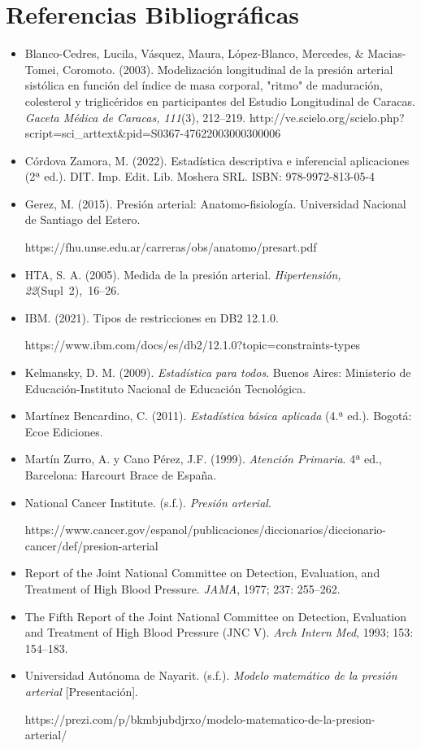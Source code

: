 \documentclass[a4paper,10pt]{article}
\begin{document}
\vspace{2em}

\section*{Referencias Bibliográficas}

\begin{small}
\begin{itemize}
    \item Blanco-Cedres, Lucila, Vásquez, Maura, López-Blanco, Mercedes, \& Macias-Tomei, Coromoto. (2003). Modelización longitudinal de la presión arterial sistólica en función del índice de masa corporal, "ritmo" de maduración, colesterol y triglicéridos en participantes del Estudio Longitudinal de Caracas. \textit{Gaceta Médica de Caracas, 111}(3), 212–219. http://ve.scielo.org/scielo.php?script=sci\_arttext\&pid=S0367-47622003000300006
    \item Córdova Zamora, M. (2022). Estadística descriptiva e inferencial aplicaciones (2ª ed.). DIT. Imp. Edit. Lib. Moshera SRL. ISBN: 978-9972-813-05-4
    \item Gerez, M. (2015). Presión arterial: Anatomo-fisiología. Universidad Nacional de Santiago del Estero. 
    
    https://fhu.unse.edu.ar/carreras/obs/anatomo/presart.pdf
    \item HTA, S. A. (2005). Medida de la presión arterial. \textit{Hipertensión, 22}(Supl 2), 16–26.
    \item IBM. (2021). Tipos de restricciones en DB2 12.1.0. 
    
    https://www.ibm.com/docs/es/db2/12.1.0?topic=constraints-types
    \item Kelmansky, D. M. (2009). \textit{Estadística para todos}. Buenos Aires: Ministerio de Educación-Instituto Nacional de Educación Tecnológica.
    \item Martínez Bencardino, C. (2011). \textit{Estadística básica aplicada} (4.ª ed.). Bogotá: Ecoe Ediciones.
    \item Martín Zurro, A. y Cano Pérez, J.F. (1999). \textit{Atención Primaria}. 4ª ed., Barcelona: Harcourt Brace de España.
    \item National Cancer Institute. (s.f.). \textit{Presión arterial}. 
    
    https://www.cancer.gov/espanol/publicaciones/diccionarios/diccionario-cancer/def/presion-arterial
    \item Report of the Joint National Committee on Detection, Evaluation, and Treatment of High Blood Pressure. \textit{JAMA}, 1977; 237: 255–262.
    \item The Fifth Report of the Joint National Committee on Detection, Evaluation and Treatment of High Blood Pressure (JNC V). \textit{Arch Intern Med}, 1993; 153: 154–183.
    \item Universidad Autónoma de Nayarit. (s.f.). \textit{Modelo matemático de la presión arterial} [Presentación]. 
    
    https://prezi.com/p/bkmbjubdjrxo/modelo-matematico-de-la-presion-arterial/
\end{itemize}
\end{small}
\end{document}
